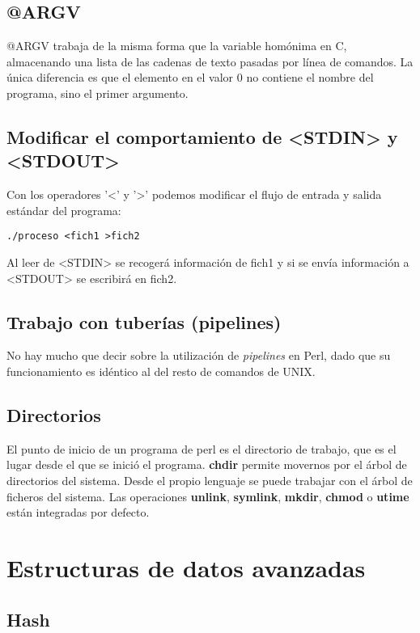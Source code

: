 \documentclass[12pt,a4paper]{memoir} %
\begin{document}
	\section{@ARGV}
	@ARGV trabaja de la misma forma que la variable homónima en C, almacenando una lista de las cadenas de texto pasadas por línea de comandos. La única diferencia es que el elemento en el valor 0 no contiene el nombre del programa, sino el primer argumento.
	\section{Modificar el comportamiento de \textless{}STDIN\textgreater{} y \textless{}STDOUT\textgreater}
	Con los operadores '\textless' y '\textgreater' podemos modificar el flujo de entrada y salida estándar del programa:
	\lstset{language=Perl, showspaces=false}
	\begin{lstlisting}[frame=single, showspaces=false]
	./proceso <fich1 >fich2
	\end{lstlisting}
	Al leer de \textless{}STDIN\textgreater{}  se recogerá información de fich1 y si se envía información a \textless{}STDOUT\textgreater{} se escribirá en fich2.
	\section{Trabajo con tuberías (pipelines)}
	No hay mucho que decir sobre la utilización de \textit{pipelines} en Perl, dado que su funcionamiento es idéntico al del resto de comandos de UNIX.
	\section{Directorios}
	El punto de inicio de un programa de perl es el directorio de trabajo, que es el lugar desde el que se inició el programa. \textbf{chdir} permite movernos por el árbol de directorios del sistema.
	Desde el propio lenguaje se puede trabajar con el árbol de ficheros del sistema. Las operaciones \textbf{unlink}, \textbf{symlink}, \textbf{mkdir}, \textbf{chmod} o \textbf{utime} están integradas por defecto.
	\chapter{Estructuras de datos avanzadas}
	\section{Hash}
\end{document}
